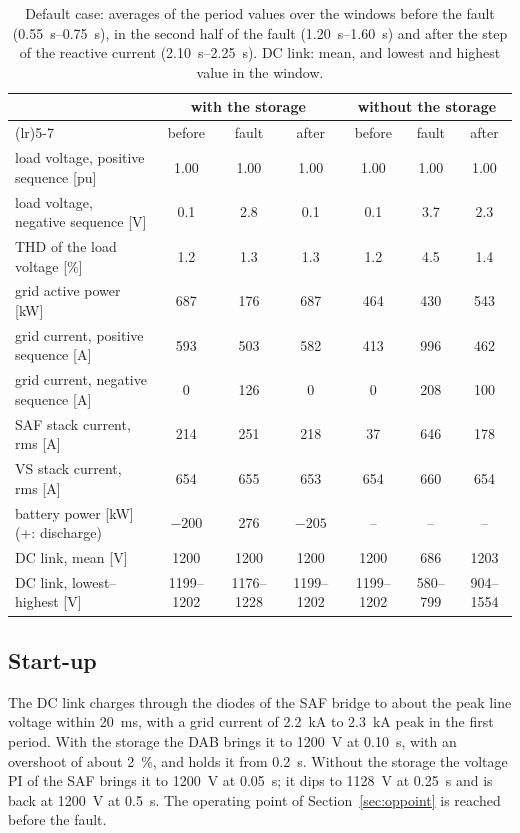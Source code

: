 \documentclass[11pt,a4paper]{scrartcl}
\begin{document}
\begin{onehalfspace}
\begin{table}[H]
	\centering
	\captionsetup{width=0.95\textwidth, font=small}
	\caption{Default case: averages of the period values over the windows before the fault (\SIrange{0.55}{0.75}{s}), in the second half of the fault (\SIrange{1.20}{1.60}{s}) and after the step of the reactive current (\SIrange{2.10}{2.25}{s}). DC link: mean, and lowest and highest value in the window.}
	\label{tab:results}
	\scriptsize
	\begin{tabularx}{\textwidth}{>{\raggedright\arraybackslash}X cccccc}
		\toprule
		& \multicolumn{3}{c}{with the storage} & \multicolumn{3}{c}{without the storage} \\
		\cmidrule(lr){2-4} \cmidrule(lr){5-7}
		& before & fault & after & before & fault & after \\
		\midrule
		load voltage, positive sequence [pu] & 1.00 & 1.00 & 1.00 & 1.00 & 1.00 & 1.00 \\
		load voltage, negative sequence [V] & 0.1 & 2.8 & 0.1 & 0.1 & 3.7 & 2.3 \\
		THD of the load voltage [\%] & 1.2 & 1.3 & 1.3 & 1.2 & 4.5 & 1.4 \\
		grid active power [kW] & 687 & 176 & 687 & 464 & 430 & 543 \\
		grid current, positive sequence [A] & 593 & 503 & 582 & 413 & 996 & 462 \\
		grid current, negative sequence [A] & 0 & 126 & 0 & 0 & 208 & 100 \\
		SAF stack current, rms [A] & 214 & 251 & 218 & 37 & 646 & 178 \\
		VS stack current, rms [A] & 654 & 655 & 653 & 654 & 660 & 654 \\
		battery power [kW] (+: discharge) & $-200$ & 276 & $-205$ & -- & -- & -- \\
		DC link, mean [V] & 1200 & 1200 & 1200 & 1200 & 686 & 1203 \\
		DC link, lowest--highest [V] & 1199--1202 & 1176--1228 & 1199--1202 & 1199--1202 & 580--799 & 904--1554 \\
		\bottomrule
	\end{tabularx}
\end{table}

\subsection{Start-up}
\label{sec:res_startup}

The DC link charges through the diodes of the SAF bridge to about the peak line voltage within \SI{20}{ms}, with a grid current of \SI{2.2}{kA} to \SI{2.3}{kA} peak in the first period. With the storage the DAB brings it to \SI{1200}{V} at \SI{0.10}{s}, with an overshoot of about \SI{2}{\percent}, and holds it from \SI{0.2}{s}. Without the storage the voltage PI of the SAF brings it to \SI{1200}{V} at \SI{0.05}{s}; it dips to \SI{1128}{V} at \SI{0.25}{s} and is back at \SI{1200}{V} at \SI{0.5}{s}. The operating point of Section~\ref{sec:oppoint} is reached before the fault.


\end{onehalfspace}
\end{document}
